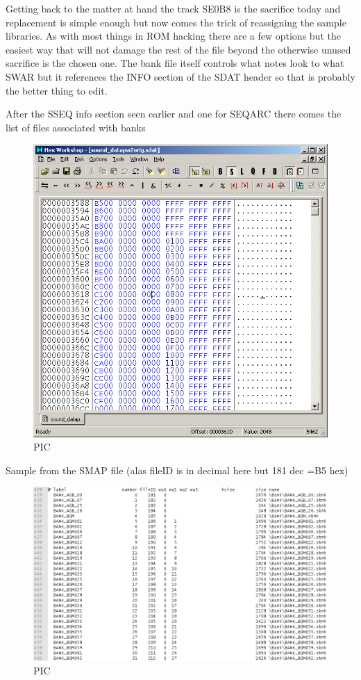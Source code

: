 \documentclass[
]{book}
\begin{document}
Getting back to the matter at hand the track SE0B8 is the sacrifice today and replacement is simple enough but now comes the trick of reassigning the sample libraries. As with most things in ROM hacking there are a few options but the easiest way that will not damage the rest of the file beyond the otherwise unused sacrifice is the chosen one. The bank file itself controls what notes look to what SWAR but it references the INFO section of the SDAT header so that is probably the better thing to edit.

After the SSEQ info section seen earlier and one for SEQARC there comes the list of files associated with banks

\begin{figure}
\centering
\includegraphics{images/146_home_fast6191_romhackingguide_unrenamed_fil___inal_borders_romhackingguidesdatinjection_3.png}
\caption{PIC}
\end{figure}

Sample from the SMAP file (alas fileID is in decimal here but 181 dec =B5 hex)

\begin{figure}
\centering
\includegraphics{images/147_home_fast6191_romhackingguide_unrenamed_fil___inal_borders_romhackingguidesdatinjection_4.png}
\caption{PIC}
\end{figure}
\end{document}
